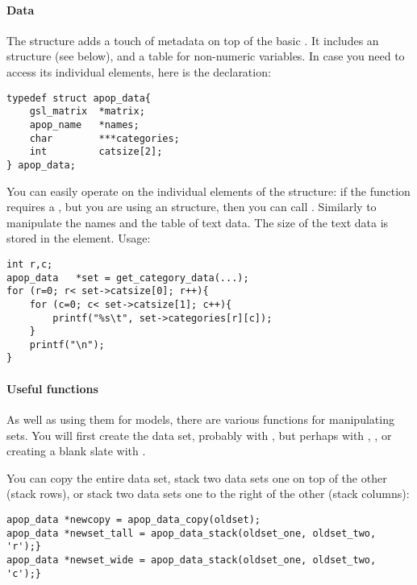 \paragraph{Data} 
The  structure adds a touch of metadata on top of the
basic . It includes an  structure (see
below), and a table for non-numeric variables. In case you need to access
its individual elements, here is the declaration:

\begin{lstlisting}
typedef struct apop_data{
    gsl_matrix  *matrix;
    apop_name   *names;
    char        ***categories;
    int         catsize[2];
} apop_data;
\end{lstlisting}
You can easily operate on the individual elements of the structure:
if the  function requires a
, but you are using an 
structure, then you can call
. Similarly to
manipulate the names and the table of text data. The size of the text
data is stored in the  element. Usage:

\begin{lstlisting}
int r,c;
apop_data   *set = get_category_data(...);
for (r=0; r< set->catsize[0]; r++){
    for (c=0; c< set->catsize[1]; c++){
        printf("%s\t", set->categories[r][c]);
    }
    printf("\n");
}
\end{lstlisting}

\paragraph{Useful functions} As well as using them for models, there are
various functions for manipulating  sets. You will
first
create the data set, probably with , but perhaps
with , , or
creating a blank slate with .

You can copy the entire data set, 
stack two data sets one on top of the other (stack rows), or 
stack two data sets one to the right of the other (stack columns):
\begin{lstlisting}
apop_data *newcopy = apop_data_copy(oldset);
apop_data *newset_tall = apop_data_stack(oldset_one, oldset_two, 'r');}
apop_data *newset_wide = apop_data_stack(oldset_one, oldset_two, 'c');}
\end{lstlisting}

